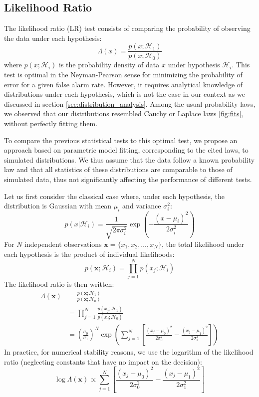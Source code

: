\documentclass{article}
\begin{document}
\subsection{Likelihood Ratio}
The likelihood ratio (LR) test consists of comparing the probability of observing the data under each hypothesis:
\begin{equation}
    \Lambda(x) = \frac{p(x;\mathcal{H}_1)}{p(x;\mathcal{H}_0)}
\end{equation}
where $p(x;\mathcal{H}_i)$ is the probability density of data $x$ under hypothesis $\mathcal{H}_i$. This test is optimal in the Neyman-Pearson sense for minimizing the probability of error for a given false alarm rate. However, it requires analytical knowledge of distributions under each hypothesis, which is not the case in our context as we discussed in section \ref{sec:distribution_analysis}. Among the usual probability laws, we observed that our distributions resembled Cauchy or Laplace laws \ref{fig:fits}, without perfectly fitting them.

 To compare the previous statistical tests to this optimal test, we propose an approach based on parametric model fitting, corresponding to the cited laws, to simulated distributions. We thus assume that the data follow a known probability law and that all statistics of these distributions are comparable to those of simulated data, thus not significantly affecting the performance of different tests.

Let us first consider the classical case where, under each hypothesis, the distribution is Gaussian with mean $\mu_i$ and variance $\sigma_i^2$:
\begin{equation}
    p(x|\mathcal{H}_i) = \frac{1}{\sqrt{2\pi\sigma_i^2}} \exp\left(-\frac{(x-\mu_i)^2}{2\sigma_i^2}\right)
\end{equation}
For $N$ independent observations $\mathbf{x} = \{x_1, x_2, \ldots, x_N\}$, the total likelihood under each hypothesis is the product of individual likelihoods:
\begin{equation}
    p(\mathbf{x};\mathcal{H}_i) = \prod_{j=1}^N p(x_j;\mathcal{H}_i)
\end{equation}
The likelihood ratio is then written:
\begin{align}
    \Lambda(\mathbf{x}) &= \frac{p(\mathbf{x};\mathcal{H}_1)}{p(\mathbf{x};\mathcal{H}_0)} \\
    &= \prod_{j=1}^N \frac{p(x_j;\mathcal{H}_1)}{p(x_j;\mathcal{H}_0)} \\
    &= \left(\frac{\sigma_0}{\sigma_1}\right)^N \exp\left( \sum_{j=1}^N \left[ \frac{(x_j-\mu_0)^2}{2\sigma_0^2} - \frac{(x_j-\mu_1)^2}{2\sigma_1^2} \right] \right)
\end{align}
In practice, for numerical stability reasons, we use the logarithm of the likelihood ratio (neglecting constants that have no impact on the decision):
\begin{equation}
    \log \Lambda(\mathbf{x}) \propto \sum_{j=1}^N \left[ \frac{(x_j-\mu_0)^2}{2\sigma_0^2} - \frac{(x_j-\mu_1)^2}{2\sigma_1^2} \right]
\end{equation}
\end{document}
